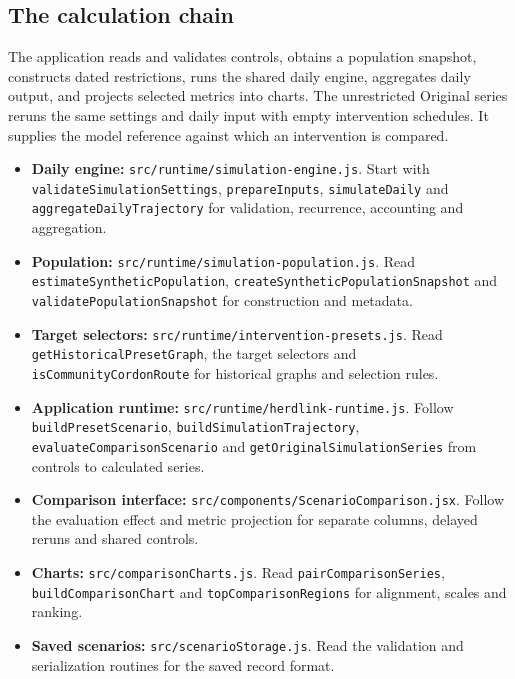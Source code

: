 \documentclass[11pt,a4paper]{article}
\providecommand{\tightlist}{\setlength{\itemsep}{0.3em}\setlength{\parskip}{0pt}}
\begin{document}
\subsection{The calculation chain}\label{the-calculation-chain}

The application reads and validates controls, obtains a population
snapshot, constructs dated restrictions, runs the shared daily engine,
aggregates daily output, and projects selected metrics into charts. The
unrestricted Original series reruns the same settings and daily input
with empty intervention schedules. It supplies the model reference
against which an intervention is compared.

\begin{itemize}
\tightlist
\item
  \textbf{Daily engine:} \nolinkurl{src/runtime/simulation-engine.js}.
  Start with \nolinkurl{validateSimulationSettings},
  \nolinkurl{prepareInputs}, \nolinkurl{simulateDaily} and
  \nolinkurl{aggregateDailyTrajectory} for validation, recurrence,
  accounting and aggregation.
\item
  \textbf{Population:} \nolinkurl{src/runtime/simulation-population.js}.
  Read \nolinkurl{estimateSyntheticPopulation},
  \nolinkurl{createSyntheticPopulationSnapshot} and
  \nolinkurl{validatePopulationSnapshot} for construction and metadata.
\item
  \textbf{Target selectors:}
  \nolinkurl{src/runtime/intervention-presets.js}. Read
  \nolinkurl{getHistoricalPresetGraph}, the target selectors and
  \nolinkurl{isCommunityCordonRoute} for historical graphs and selection
  rules.
\item
  \textbf{Application runtime:}
  \nolinkurl{src/runtime/herdlink-runtime.js}. Follow
  \nolinkurl{buildPresetScenario},
  \nolinkurl{buildSimulationTrajectory},
  \nolinkurl{evaluateComparisonScenario} and
  \nolinkurl{getOriginalSimulationSeries} from controls to calculated
  series.
\item
  \textbf{Comparison interface:}
  \nolinkurl{src/components/ScenarioComparison.jsx}. Follow the
  evaluation effect and metric projection for separate columns, delayed
  reruns and shared controls.
\item
  \textbf{Charts:} \nolinkurl{src/comparisonCharts.js}. Read
  \nolinkurl{pairComparisonSeries}, \nolinkurl{buildComparisonChart} and
  \nolinkurl{topComparisonRegions} for alignment, scales and ranking.
\item
  \textbf{Saved scenarios:} \nolinkurl{src/scenarioStorage.js}. Read the
  validation and serialization routines for the saved record format.
\end{itemize}
\end{document}
